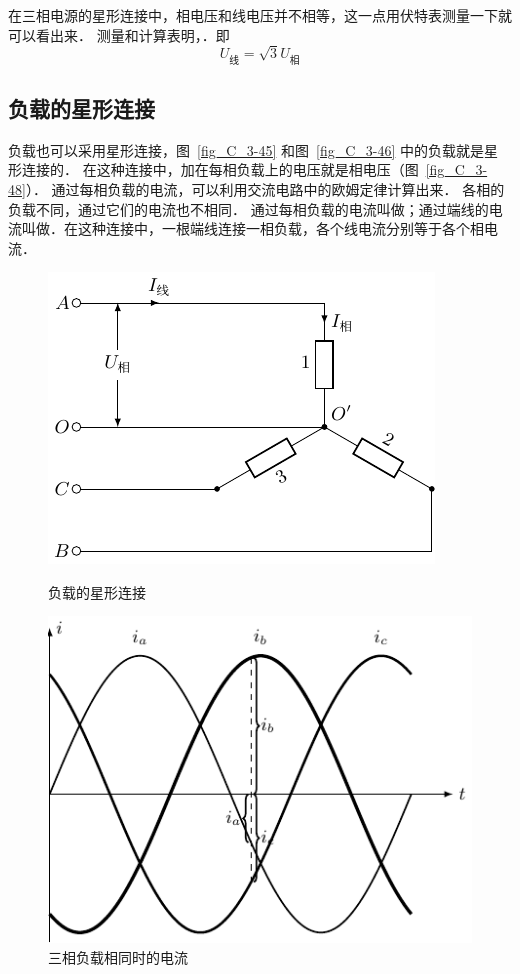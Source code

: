 在三相电源的星形连接中，相电压和线电压并不相等，这一点用伏特表测量一下就可以看出来．
测量和计算表明，．即
\[U_{\text{线}}=\sqrt{3}U_{\text{相}}\]

\subsection{负载的星形连接}


负载也可以采用星形连接，图~\ref{fig_C_3-45} 和图~\ref{fig_C_3-46} 中的负载就是星形连接的．
在这种连接中，加在每相负载上的电压就是相电压（图~\ref{fig_C_3-48}）．
通过每相负载的电流，可以利用交流电路中的欧姆定律计算出来．
各相的负载不同，通过它们的电流也不相同．
通过每相负载的电流叫做；通过端线的电流叫做．在这种连接中，一根端线连接一相负载，各个线电流分别等于各个相电流．
\begin{figure}[htbp]
    \centering
    \begin{minipage}[b]{0.47\linewidth}
    	\centering
    	 \includegraphics{fig/C/3-48.pdf}
    	\caption{负载的星形连接}\label{fig_C_3-48}
    \end{minipage}
    \begin{minipage}[b]{0.5\linewidth}
    	\centering
    	\includegraphics{fig/C/3-49.pdf}
    	\caption{三相负载相同时的电流}\label{fig_C_3-49}
    \end{minipage}
\end{figure}

